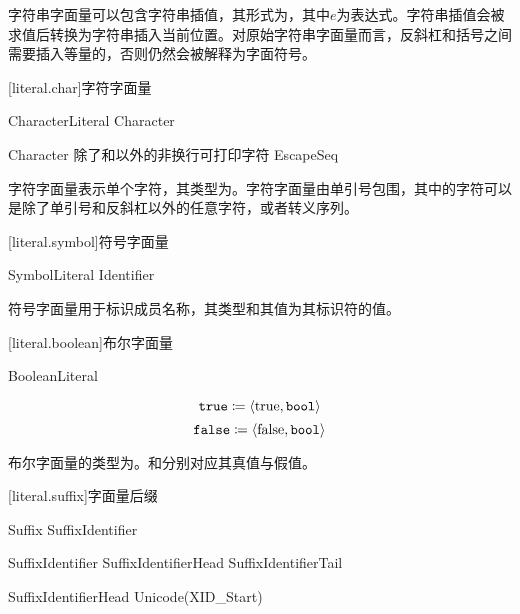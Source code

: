\pnum
字符串字面量可以包含字符串插值，其形式为，其中$e$为表达式。字符串插值会被求值后转换为字符串插入当前位置。对原始字符串字面量而言，反斜杠和括号之间需要插入等量的，否则仍然会被解释为字面符号。

[literal.char]{字符字面量}

\begin{bnf}{CharacterLiteral}
     Character 
\end{bnf}

\begin{bnf}{Character}
    \textnormal{除了\terminal{\textbackslash}和以外的非换行可打印字符} \br
    EscapeSeq
\end{bnf}

\pnum
字符字面量表示单个字符，其类型为。字符字面量由单引号包围，其中的字符可以是除了单引号和反斜杠以外的任意字符，或者转义序列。

[literal.symbol]{符号字面量}

\begin{bnf}{SymbolLiteral}
     Identifier
\end{bnf}

\pnum
符号字面量用于标识成员名称，其类型和其值为其标识符的值。

[literal.boolean]{布尔字面量}

\begin{bnf}{BooleanLiteral}
     \br
\end{bnf}

$$ \texttt{true} \coloneqq \langle \mathrm{true}, \texttt{bool} \rangle $$
$$ \texttt{false} \coloneqq \langle \mathrm{false}, \texttt{bool} \rangle $$

\pnum
布尔字面量的类型为。和分别对应其真值与假值。

[literal.suffix]{字面量后缀}

\begin{bnf}{Suffix}
    \terminal{_}\bnfq SuffixIdentifier
\end{bnf}

\begin{bnf}{SuffixIdentifier}
    SuffixIdentifierHead SuffixIdentifierTail\bnfs
\end{bnf}

\begin{bnf}{SuffixIdentifierHead}
    Unicode(XID_Start)
\end{bnf}

